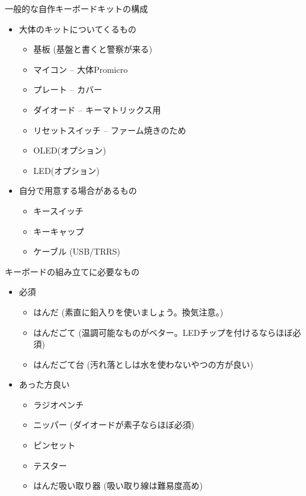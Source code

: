\documentclass[cjk,dvipdfmx,10pt,compress,fragile%
hyperref={bookmarks=true,bookmarksnumbered=true,bookmarksopen=false,%
colorlinks=false,%
pdftitle={第 134 回 関西 Debian 勉強会},%
pdfauthor={小林},%
pdfsubject={資料},%
}]{beamer}
\begin{document}
\begin{frame}[fragile,t]{一般的な自作キーボードキットの構成}
 \begin{itemize}
  \item 大体のキットについてくるもの
	\begin{itemize}
	 \item 基板 (基盤と書くと警察が来る)
	 \item マイコン -- 大体Promicro
	 \item プレート -- カバー
	 \item ダイオード -- キーマトリックス用
	 \item リセットスイッチ -- ファーム焼きのため
	 \item OLED(オプション)
	 \item LED(オプション)
	\end{itemize}
  \item 自分で用意する場合があるもの
	\begin{itemize}
	 \item キースイッチ
	 \item キーキャップ
	 \item ケーブル (USB/TRRS)
	\end{itemize}
 \end{itemize}
\end{frame}

\begin{frame}[fragile,t]{キーボードの組み立てに必要なもの}
 \begin{itemize}
  \item 必須
	\begin{itemize}
	 \item はんだ (素直に鉛入りを使いましょう。換気注意。)
	 \item はんだごて (温調可能なものがベター。LEDチップを付けるならほぼ必須)
	 \item はんだごて台 (汚れ落としは水を使わないやつの方が良い)
	\end{itemize}
  \item あった方良い
	\begin{itemize}
	 \item ラジオペンチ
	 \item ニッパー (ダイオードが素子ならほぼ必須)
	 \item ピンセット
	 \item テスター
	 \item はんだ吸い取り器 (吸い取り線は難易度高め)
	\end{itemize}
 \end{itemize}
\end{frame}
\end{document}
